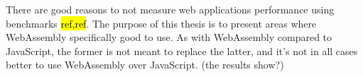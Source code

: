 \begin{comment}
Page 10

Our results show that real web applications have much more JavaScript code than the SunSpider and V8 bench- marks and that most of that code is cold.

Page 11

There are surprisingly few papers measuring specific as- pects of JavaScript behavior, despite how widely used it is in practice.

Page 12

JavaScript web applications are large, complex, and highly interactive programs. While the functionality they implement varies significantly, we observe that the real applications have much in com- mon with each other as well. In contrast, the JavaScript benchmarks are small, and behave in ways that are sig- nificantly different than the real applications.

An analysis of the dynamic behavior of JavaScript programs.

\end{comment}


There are good reasons to not measure web applications performance using benchmarks \hl{ref,ref}. The purpose of this thesis is to present areas where WebAssembly specifically good to use. As with WebAssembly compared to JavaScript, the former is not meant to replace the latter, and it's not in all cases better to use WebAssembly over JavaScript. (the results show?)


















